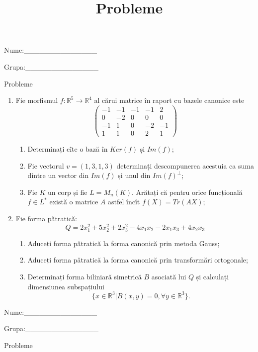 \documentclass{article}
\title{Probleme}
\author{ }
\date{ }
\begin{document}
\begin{flushright}
Nume:\_\_\_\_\_\_\_\_\_\_\_\_\_\_
 
 
Grupa:\_\_\_\_\_\_\_\_\_\_\_\_\_\_
\end{flushright}
\begin{center}
\vspace{2cm}
{\Large Probleme}
\vspace{2cm}
\end{center}
\begin{enumerate}
 \item Fie morfismul $f:\mathbb{R}^5 \to \mathbb{R}^4$ al cărui matrice în raport cu bazele canonice este
$$\begin{pmatrix}
-1&-1&-1&-1&2\\
0&-2&0&0&0\\
-1&1&0&-2&-1\\
1&1&0&2&1
\end{pmatrix}$$

\begin{enumerate}
\item Determinați cîte o bază în $Ker(f)$ și $Im(f)$;
\item Fie vectorul $v=(1,3,1,3)$ determinați descompunerea acestuia ca suma dintre un vector din $Im(f)$ și unul din $Im(f)^\perp$;
\item Fie $K$ un corp și fie $L=M_n(K)$. Arătați că pentru orice funcțională $f \in L^*$ există o matrice $A$ astfel încît $f(X)=Tr(AX)$;
\end{enumerate}
\item Fie forma pătratică:
$$Q= 2x_1^2+5x_2^2+2x_3^2-4x_1x_2-2x_1x_3+4x_2x_3$$

\begin{enumerate}
\item Aduceți forma pătratică la forma canonică prin metoda Gauss;
\item Aduceți forma pătratică la forma canonică prin transformări ortogonale;
\item Determinați forma biliniară simetrică $B$ asociată lui $Q$ și calculați dimensiunea subspațiului
$$\{x \in \mathbb{R}^3 | B(x,y)=0,\forall y \in \mathbb{R}^3\}.$$

\end{enumerate}
\end{enumerate}
\newpage
\begin{flushright}
Nume:\_\_\_\_\_\_\_\_\_\_\_\_\_\_
 
 
Grupa:\_\_\_\_\_\_\_\_\_\_\_\_\_\_
\end{flushright}
\begin{center}
\vspace{2cm}
{\Large Probleme}
\vspace{2cm}
\end{center}
\end{document}
